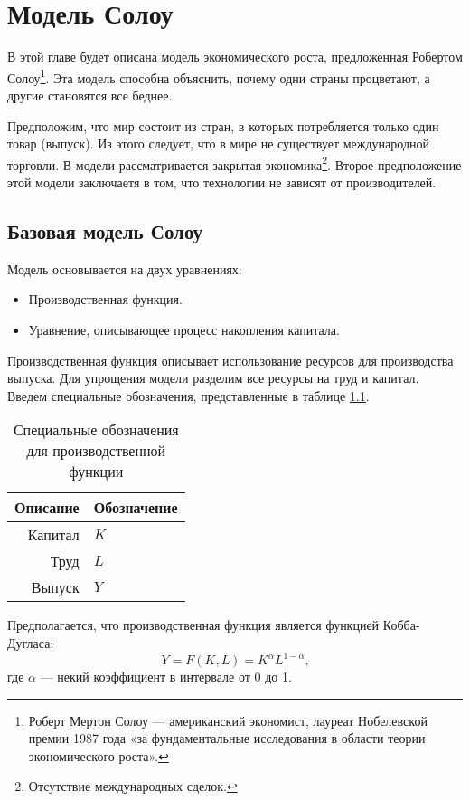 \chapter{Модель Солоу}
\label{cha:solow_models}

В этой главе будет описана модель экономического роста, предложенная Робертом Солоу\footnote{Роберт Мертон Солоу --- американский экономист, лауреат Нобелевской премии 1987 года «за фундаментальные исследования в области теории экономического роста»\cite{wiki_solow}.}.
Эта модель способна объяснить, почему одни страны процветают, а другие становятся все беднее.

Предположим, что мир состоит из стран, в которых потребляется только один товар (выпуск).
Из этого следует, что в мире не существует международной торговли.
В модели рассматривается закрытая экономика\footnote{Отсутствие международных сделок.}.
Второе предположение этой модели заключаетя в том, что технологии не зависят от производителей.

\section{Базовая модель Солоу}

Модель основывается на двух уравнениях:
\begin{itemize}
	\item Производственная функция.
	\item Уравнение, описывающее процесс накопления капитала.
\end{itemize}
Производственная функция описывает использование ресурсов для производства выпуска.
Для упрощения модели разделим все ресурсы на труд и капитал.
Введем специальные обозначения, представленные в таблице \ref{tab:prod_func}.
\begin{table}[ht]
	\centering
	\caption{Специальные обозначения для производственной функции}
	\begin{tabular}{|r|l|}
		\hline
		Описание & Обозначение \\ \hline
		Капитал  &      $K$    \\
		Труд     &      $L$    \\
		Выпуск   &      $Y$    \\ \hline
		\end{tabular}%
	\label{tab:prod_func}
\end{table}
Предполагается, что производственная функция является функцией Кобба-Дугласа:
\begin{equation}
	Y = F(K, L) = K^{\alpha}L^{1-\alpha}\text{,}
\label{F:Cob_Duglas}
\end{equation}
где $\alpha$ --- некий коэффициент в интервале от 0 до 1.

